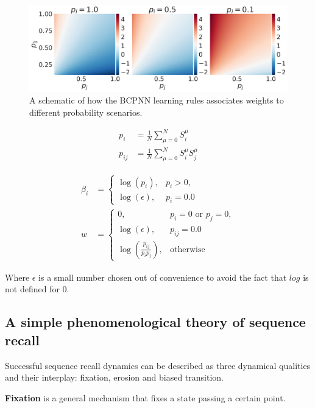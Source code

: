 \documentclass[10pt,a4paper]{article}
\begin{document}
\begin{figure}[H]
\centering
\includegraphics[scale=0.30]{bcpnn_probabiltiies.pdf}
\caption{A schematic of how the BCPNN learning rules associates weights to different probability scenarios.}
\label{fig:bcpnn_probabilities}
\end{figure}

\begin{align}
p_i &= \frac{1}{N}\sum_{\mu=0}^{N} S_i^{\mu} \label{eq:prob_counting} \\  
p_{ij} &= \frac{1}{N} \sum_{\mu=0}^N S_i^{\mu} S_j^{\mu} \label{eq:prob_counting_co}
\end{align}

\begin{align}
\beta_i &=  \begin{cases}
       \log(p_i),&  p_i > 0,\\
       \log(\epsilon),& p_i = 0.0
    \end{cases} \label{eq:bcpnn_beta} \\
w &= \begin{cases}
       0 ,&  p_i=0 \text{ or } p_j = 0,\\
       \log(\epsilon),& p_{ij} = 0.0 \\
       \log(\frac{p_{ij}}{p_i p_j}),&  \text{otherwise}  
    \end{cases} \label{eq:bcpnn_w}
\end{align}

Where $\epsilon$ is a small number chosen out of convenience to avoid the fact that $log$ is not defined for $0$. 
 

\subsection{A simple phenomenological theory of sequence recall}
Successful sequence recall dynamics can be described as three dynamical qualities and their interplay: fixation, erosion and biased transition. 

\textbf{Fixation} is a general mechanism that fixes a state passing a certain point.
\end{document}

